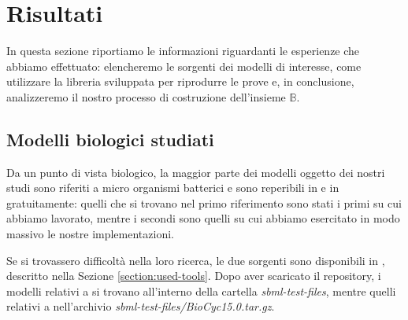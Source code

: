 \section{Risultati}
In questa sezione riportiamo le informazioni riguardanti le esperienze
che abbiamo effettuato: elencheremo le sorgenti dei modelli di
interesse, come utilizzare la libreria sviluppata per riprodurre le
prove e, in conclusione, analizzeremo il nostro processo di
costruzione dell'insieme $\mathbb{B}$.

\subsection{Modelli biologici studiati}
Da un punto di vista biologico, la maggior parte dei modelli oggetto
dei nostri studi sono riferiti a micro organismi batterici e sono
reperibili in \cite{SymBioCyc} e in \cite{MetExplore} gratuitamente:
quelli che si trovano nel primo riferimento sono stati i primi su cui
abbiamo lavorato, mentre i secondi sono quelli su cui abbiamo
esercitato in modo massivo le nostre implementazioni.

Se si trovassero difficolt\`a nella loro ricerca, le due sorgenti sono
disponibili in \cite{MyJavaImpl}, descritto nella Sezione
\ref{section:used-tools}. Dopo aver scaricato il repository, i modelli
relativi a \cite{SymBioCyc} si trovano all'interno della cartella
\emph{sbml-test-files}, mentre quelli relativi a \cite{MetExplore}
nell'archivio \emph{sbml-test-files/BioCyc15.0.tar.gz}.

